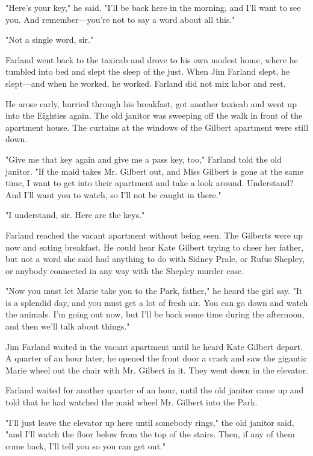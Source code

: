 \documentclass{novel}
\begin{document}
"Here's your key," he said. "I'll be back here in the morning, and I'll want to see you. And remember---you're not to say a word about all this."

"Not a single word, sir."

Farland went back to the taxicab and drove to his own modest home, where he tumbled into bed and slept the sleep of the just. When Jim Farland slept, he slept---and when he worked, he worked. Farland did not mix labor and rest.

He arose early, hurried through his breakfast, got another taxicab and went up into the Eighties again. The old janitor was sweeping off the walk in front of the apartment house. The curtains at the windows of the Gilbert apartment were still down.

"Give me that key again and give me a pass key, too," Farland told the old janitor. "If the maid takes Mr. Gilbert out, and Miss Gilbert is gone at the same time, I want to get into their apartment and take a look around. Understand? And I'll want you to watch, so I'll not be caught in there."

"I understand, sir. Here are the keys."

Farland reached the vacant apartment without being seen. The Gilberts were up now and eating breakfast. He could hear Kate Gilbert trying to cheer her father, but not a word she said had anything to do with Sidney Prale, or Rufus Shepley, or anybody connected in any way with the Shepley murder case.

"Now you must let Marie take you to the Park, father," he heard the girl say. "It is a splendid day, and you must get a lot of fresh air. You can go down and watch the animals. I'm going out now, but I'll be back some time during the afternoon, and then we'll talk about things."

Jim Farland waited in the vacant apartment until he heard Kate Gilbert depart. A quarter of an hour later, he opened the front door a crack and saw the gigantic Marie wheel out the chair with Mr. Gilbert in it. They went down in the elevator.

Farland waited for another quarter of an hour, until the old janitor came up and told that he had watched the maid wheel Mr. Gilbert into the Park.

"I'll just leave the elevator up here until somebody rings," the old janitor said, "and I'll watch the floor below from the top of the stairs. Then, if any of them come back, I'll tell you so you can get out."
\end{document}
